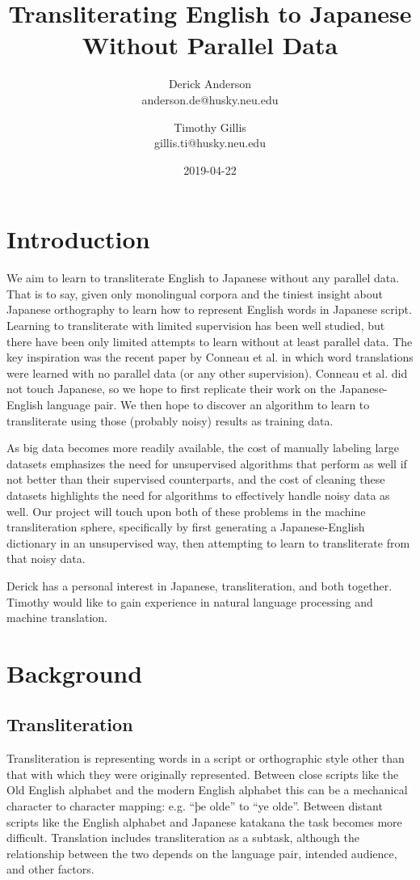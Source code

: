 \documentclass{article}
\title{Transliterating English to Japanese Without Parallel Data}
\date{2019-04-22}
\author{Derick Anderson \\ anderson.de@husky.neu.edu
  \and Timothy Gillis \\ gillis.ti@husky.neu.edu }
\begin{document}
\maketitle

\section*{Introduction}

We aim to learn to transliterate English to Japanese
without any parallel data.
That is to say,
given only monolingual corpora
and the tiniest insight about Japanese orthography
to learn how to represent English words in Japanese script.
Learning to transliterate with limited supervision has been well studied,
but there have been only limited attempts to learn without at least parallel data.
The key inspiration was the recent paper by
Conneau et al. \cite{Conneau2018WordTW}
in which word translations were learned with no parallel data
(or any other supervision).
Conneau et al. did not touch Japanese,
so we hope to first replicate their work on the Japanese-English language pair.
We then hope to discover an algorithm to learn to transliterate
using those (probably noisy) results as training data.

As big data becomes more readily available, the cost of manually labeling large
datasets emphasizes the need for unsupervised algorithms that perform as well if
not better than their supervised counterparts, and the cost of cleaning these
datasets highlights the need for algorithms to effectively handle noisy data as well.
Our project will touch upon both of these problems in the machine transliteration
sphere, specifically by first generating a Japanese-English dictionary in an
unsupervised way, then attempting to learn to transliterate from that noisy data.

Derick has a personal interest in Japanese, transliteration, and both together.
Timothy would like to gain experience in natural language processing and machine
translation.

\section*{Background}

\subsection*{Transliteration}

Transliteration is representing words
in a script or orthographic style
other than that with which they were originally represented.
Between close scripts like the Old English alphabet and the modern English alphabet
this can be a mechanical character to character mapping:
e.g. ``þe olde'' to ``ye olde''.
Between distant scripts
like the English alphabet and Japanese katakana
the task becomes more difficult.
Translation includes transliteration as a subtask,
although the relationship between the two
depends on the language pair, intended audience, and other factors.
\end{document}
